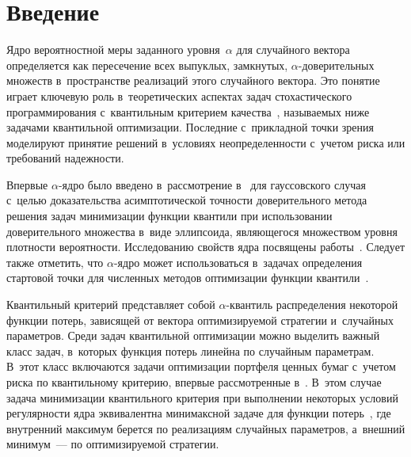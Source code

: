   
\vspace*{-6pt}



\thispagestyle{headings}

\begin{multicols}{2}

\label{st\stat}


\section{Введение} 

Ядро вероятностной меры заданного уровня~$\alpha$ для случайного вектора
 определяется как пересечение всех вы\-пук\-лых, замк\-ну\-тых, $\alpha$-до\-ве\-ри\-тель\-ных 
 множеств в~про\-стран\-ст\-ве реализаций этого случайного вектора. Это понятие 
 играет клю\-че\-вую роль в~тео\-ре\-ти\-че\-ских аспектах задач сто\-ха\-сти\-че\-ско\-го 
 программирования с~квантильным критерием качества~\cite{kankibzun}, называемых 
 ниже задачами квантильной оптимизации. Последние с~прикладной точки зрения 
 моделируют принятие решений в~условиях не\-опре\-де\-лен\-ности с~учетом риска или 
 требований   на\-деж\-ности.

Впервые $\alpha$-яд\-ро было введено в~рассмотрение в~\cite{malkib} для 
гауссовского случая с~целью доказательства асимптотической точ\-ности 
доверительного метода решения задач минимизации функции квантили при 
использовании доверительного множества в~виде эл\-лип\-со\-ида, яв\-ля\-юще\-го\-ся 
множеством уровня плот\-ности вероятности. Исследованию свойств ядра 
посвящены работы~\cite{kanrus, kansur}. Следует также отметить, что $\alpha$-яд\-ро 
может использоваться в~задачах опре\-де\-ле\-ния стар\-то\-вой точ\-ки для чис\-лен\-ных методов 
оптимизации функ\-ции квантили~\cite{kibkurb, kibkurben}.

Квантильный критерий пред\-став\-ля\-ет собой \mbox{$\alpha$-кван}\-тиль 
распределения некоторой функции потерь, зависящей от вектора оптимизируемой 
стратегии и~случайных па\-ра\-мет\-ров. Среди задач квантильной оптимизации можно
 выделить важный класс задач, в~которых функция потерь линейна по случайным 
 па\-ра\-мет\-рам.
В~этот класс включаются задачи оптимизации портфеля ценных бумаг с~учетом 
риска по квантильному критерию, впервые рас\-смот\-рен\-ные в~\cite{moeseke}.
В~этом случае задача минимизации квантильного критерия при выполнении 
некоторых условий регулярности ядра эквивалентна минимаксной 
задаче для функции потерь~\cite{kankibzun}, где внут\-рен\-ний максимум берется по реализациям 
случайных па\-ра\-мет\-ров, а~внеш\-ний минимум~--- по оптимизируемой стратегии. 


\end{multicols}
